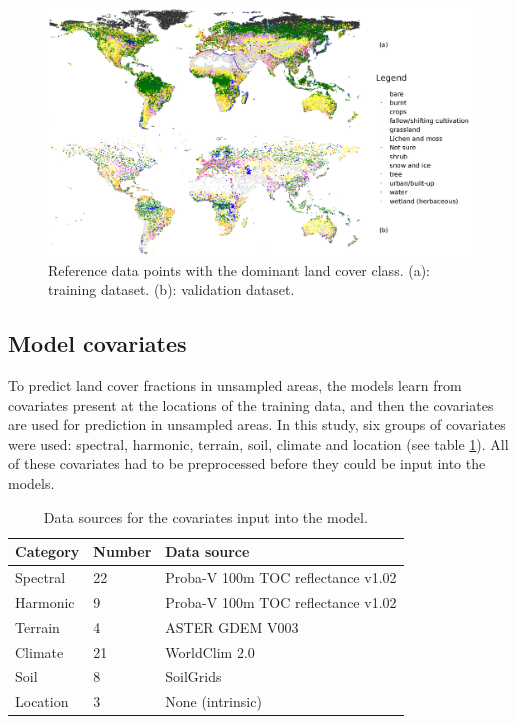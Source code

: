 \documentclass[a4paper,10pt]{article}
\begin{document}
\begin{figure}
 \includegraphics[width=\textwidth]{article-figures/maps/2019-08-06-training-and-validation}
 \caption{Reference data points with the dominant land cover class. (a): training dataset. (b): validation dataset.}
 \label{fig-reference-data}
\end{figure}

\subsection{Model covariates}

To predict land cover fractions in unsampled areas, the models learn from covariates present at the locations of the training data, and then the covariates are used for prediction in unsampled areas.
In this study, six groups of covariates were used: spectral, harmonic, terrain, soil, climate and location (see table \ref{tab-inputdata}).
All of these covariates had to be preprocessed before they could be input into the models.

\begin{table}
\centering
    \begin{tabular}{llp{6cm}}
         \toprule
         \textbf{Category} & \textbf{Number} & \textbf{Data source} \\
         \midrule
         Spectral & 22 & Proba-V 100m \ac{TOC} reflectance v1.02 \citep{probavguide2} \\
         Harmonic & 9 & Proba-V 100m \ac{TOC} reflectance v1.02 \citep{probavguide2} \\
         Terrain & 4 & ASTER GDEM V003 \citep{ASTGTM003} \\
         Climate & 21 & WorldClim 2.0 \citep{worldclim2} \\
         Soil & 8 & SoilGrids \citep{hengl_soilgrids250m_2017} \\
         Location & 3 & None (intrinsic) \\
         \bottomrule
    \end{tabular}
    \label{tab-inputdata}
    \caption{Data sources for the covariates input into the model.}
\end{table}
\end{document}
